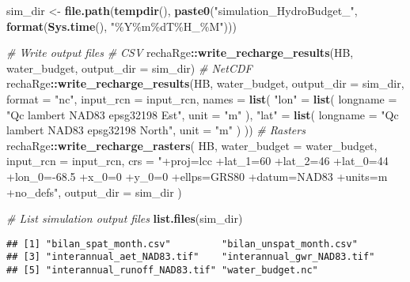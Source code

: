 \documentclass[
]{book}
\newenvironment{Shaded}{\begin{snugshade}}{\end{snugshade}}
\newcommand{\AttributeTok}[1]{\textcolor[rgb]{0.13,0.29,0.53}{#1}}
\newcommand{\CommentTok}[1]{\textcolor[rgb]{0.56,0.35,0.01}{\textit{#1}}}
\newcommand{\FunctionTok}[1]{\textcolor[rgb]{0.13,0.29,0.53}{\textbf{#1}}}
\newcommand{\NormalTok}[1]{#1}
\newcommand{\OtherTok}[1]{\textcolor[rgb]{0.56,0.35,0.01}{#1}}
\newcommand{\SpecialCharTok}[1]{\textcolor[rgb]{0.81,0.36,0.00}{\textbf{#1}}}
\newcommand{\StringTok}[1]{\textcolor[rgb]{0.31,0.60,0.02}{#1}}
\begin{document}
\begin{Shaded}
\begin{Highlighting}[]
\NormalTok{sim\_dir }\OtherTok{\textless{}{-}} \FunctionTok{file.path}\NormalTok{(}\FunctionTok{tempdir}\NormalTok{(), }\FunctionTok{paste0}\NormalTok{(}\StringTok{"simulation\_HydroBudget\_"}\NormalTok{, }\FunctionTok{format}\NormalTok{(}\FunctionTok{Sys.time}\NormalTok{(), }\StringTok{"\%Y\%m\%dT\%H\_\%M"}\NormalTok{)))}

\CommentTok{\# Write output files}
\CommentTok{\# CSV}
\NormalTok{rechaRge}\SpecialCharTok{::}\FunctionTok{write\_recharge\_results}\NormalTok{(HB, water\_budget, }\AttributeTok{output\_dir =}\NormalTok{ sim\_dir)}
\CommentTok{\# NetCDF}
\NormalTok{rechaRge}\SpecialCharTok{::}\FunctionTok{write\_recharge\_results}\NormalTok{(HB, water\_budget, }\AttributeTok{output\_dir =}\NormalTok{ sim\_dir, }\AttributeTok{format =} \StringTok{"nc"}\NormalTok{, }\AttributeTok{input\_rcn =}\NormalTok{ input\_rcn, }\AttributeTok{names =} \FunctionTok{list}\NormalTok{(}
  \StringTok{"lon"} \OtherTok{=} \FunctionTok{list}\NormalTok{(}
    \AttributeTok{longname =} \StringTok{"Qc lambert NAD83 epsg32198 Est"}\NormalTok{,}
    \AttributeTok{unit =} \StringTok{"m"}
\NormalTok{  ),}
  \StringTok{"lat"} \OtherTok{=} \FunctionTok{list}\NormalTok{(}
    \AttributeTok{longname =} \StringTok{"Qc lambert NAD83 epsg32198 North"}\NormalTok{,}
    \AttributeTok{unit =} \StringTok{"m"}
\NormalTok{  )}
\NormalTok{))}
\CommentTok{\# Rasters}
\NormalTok{rechaRge}\SpecialCharTok{::}\FunctionTok{write\_recharge\_rasters}\NormalTok{(}
\NormalTok{  HB,}
  \AttributeTok{water\_budget =}\NormalTok{ water\_budget,}
  \AttributeTok{input\_rcn =}\NormalTok{ input\_rcn,}
  \AttributeTok{crs =} \StringTok{"+proj=lcc +lat\_1=60 +lat\_2=46 +lat\_0=44 +lon\_0={-}68.5 +x\_0=0 +y\_0=0 +ellps=GRS80 +datum=NAD83 +units=m +no\_defs"}\NormalTok{,}
  \AttributeTok{output\_dir =}\NormalTok{ sim\_dir}
\NormalTok{)}


\CommentTok{\# List simulation output files}
\FunctionTok{list.files}\NormalTok{(sim\_dir)}
\end{Highlighting}
\end{Shaded}

\begin{verbatim}
## [1] "bilan_spat_month.csv"         "bilan_unspat_month.csv"      
## [3] "interannual_aet_NAD83.tif"    "interannual_gwr_NAD83.tif"   
## [5] "interannual_runoff_NAD83.tif" "water_budget.nc"
\end{verbatim}
\end{document}
